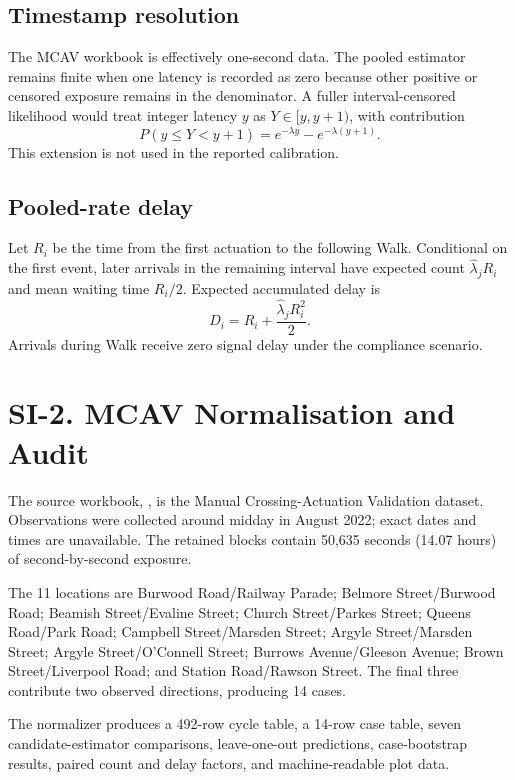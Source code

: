 \documentclass[11pt]{article}
\begin{document}
\subsection*{Timestamp resolution}

The MCAV workbook is effectively one-second data. The pooled estimator remains finite when one latency is recorded as zero because other positive or censored exposure remains in the denominator. A fuller interval-censored likelihood would treat integer latency \(y\) as \(Y\in[y,y+1)\), with contribution
\begin{equation}
P(y\leq Y<y+1)=e^{-\lambda y}-e^{-\lambda(y+1)}.
\end{equation}
This extension is not used in the reported calibration.

\subsection*{Pooled-rate delay}

Let \(R_i\) be the time from the first actuation to the following Walk. Conditional on the first event, later arrivals in the remaining interval have expected count \(\hat\lambda_jR_i\) and mean waiting time \(R_i/2\). Expected accumulated delay is
\begin{equation}
\hat D_i=R_i+\frac{\hat\lambda_jR_i^2}{2}.
\end{equation}
Arrivals during Walk receive zero signal delay under the compliance scenario.

\section*{SI-2. MCAV Normalisation and Audit}

The source workbook, , is the Manual Crossing-Actuation Validation dataset. Observations were collected around midday in August 2022; exact dates and times are unavailable. The retained blocks contain 50,635 seconds (14.07 hours) of second-by-second exposure.

The 11 locations are Burwood Road/Railway Parade; Belmore Street/Burwood Road; Beamish Street/Evaline Street; Church Street/Parkes Street; Queens Road/Park Road; Campbell Street/Marsden Street; Argyle Street/Marsden Street; Argyle Street/O'Connell Street; Burrows Avenue/Gleeson Avenue; Brown Street/Liverpool Road; and Station Road/Rawson Street. The final three contribute two observed directions, producing 14 cases.

The normalizer produces a 492-row cycle table, a 14-row case table, seven candidate-estimator comparisons, leave-one-out predictions, case-bootstrap results, paired count and delay factors, and machine-readable plot data.
\end{document}
